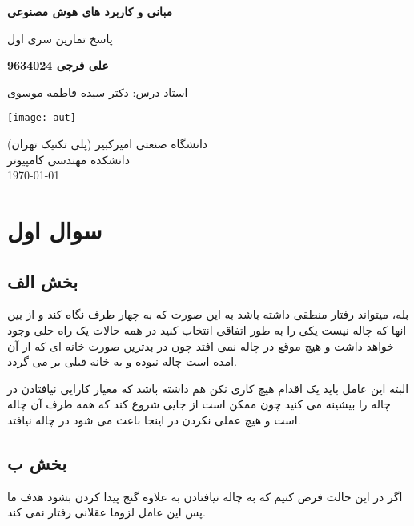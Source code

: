 \documentclass[paper=a4, fontsize=11pt]{article}
\begin{document}
\thispagestyle{empty}
	\begin{titlepage}
		\begin{center}
		
       \vspace*{1cm}
       
       \textbf{مبانی و کاربرد های هوش مصنوعی}

       \vspace{0.5cm}
       
پاسخ تمارین سری اول
       \vspace{2cm}
       

	\textbf{علی فرجی 9634024}
       
       \vspace{2cm}
       
استاد درس: دکتر سیده فاطمه موسوی
 \vfill

     \texttt{[image: aut]}
 
دانشگاه صنعتی امیرکبیر (پلی تکنیک تهران) \\
دانشکده مهندسی کامپیوتر\\
\today

   \end{center}
\end{titlepage}

\tableofcontents
\thispagestyle{empty}

\newpage

\setcounter{page}{1}

\section{سوال اول}
\subsection{بخش الف}
بله، میتواند رفتار منطقی داشته باشد به این صورت که به چهار طرف نگاه کند و از بین انها که چاله نیست یکی را به طور اتفاقی انتخاب کنید در همه حالات یک راه حلی وجود خواهد داشت و هیچ موقع در چاله نمی افتد چون در بدترین صورت خانه ای که از آن امده است چاله نبوده و به خانه قبلی بر می گردد.

البته این عامل باید یک اقدام هیچ کاری نکن هم داشته باشد که معیار کارایی نیافتادن در چاله را بیشینه می کنید چون ممکن است از جایی شروع کند که همه طرف آن چاله است و هیچ عملی نکردن در اینجا باعث می شود در چاله نیافتد.
\subsection{بخش ب}
اگر در این حالت فرض کنیم که به چاله نیافتادن به علاوه گنج پیدا کردن بشود هدف ما پس این عامل لزوما عقلانی رفتار نمی کند.
\end{document}
